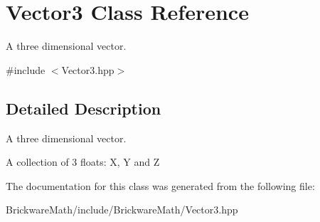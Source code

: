 \hypertarget{classVector3}{}\section{Vector3 Class Reference}
\label{classVector3}


A three dimensional vector.  




{\ttfamily \#include $<$Vector3.\+hpp$>$}



\subsection{Detailed Description}
A three dimensional vector. 

A collection of 3 floats\+: X, Y and Z 

The documentation for this class was generated from the following file\+:\begin{DoxyCompactItemize}
\item 
Brickware\+Math/include/\+Brickware\+Math/Vector3.\+hpp\end{DoxyCompactItemize}

